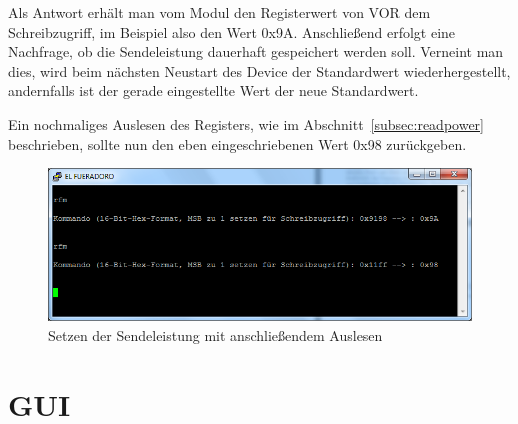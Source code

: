 \documentclass[pdftex, parskip, numbers=noenddot, toc=listof]{scrbook}
\begin{document}
					Als Antwort erhält man vom Modul den Registerwert von VOR dem Schreibzugriff, im Beispiel also den Wert 0x9A. Anschließend erfolgt eine Nachfrage, ob die Sendeleistung dauerhaft gespeichert werden soll. Verneint man dies, wird beim nächsten Neustart des Device der Standardwert wiederhergestellt, andernfalls ist der gerade eingestellte Wert der neue Standardwert.

					Ein nochmaliges Auslesen des Registers, wie im Abschnitt~\ref{subsec:readpower} beschrieben, sollte nun den eben eingeschriebenen Wert 0x98 zurückgeben.

					\begin{figure}
						\centering
						\includegraphics[width=.8\textwidth]{Bilder/rfmbefehl2}
						\caption{Setzen der Sendeleistung mit anschließendem Auslesen}
						\label{fig:rfmwrite}
					\end{figure}
					\clearpage

		\section{GUI}
\end{document}
